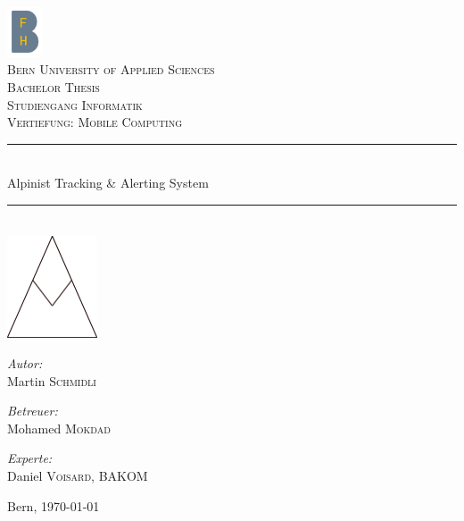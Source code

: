 \documentclass[11pt,english,german]{report}
\theoremstyle{definition}
\begin{document}
\pagestyle{empty} %
\begin{titlepage}
\begin{center}

\includegraphics[width=0.08\textwidth]{img/logo/bfh_logo.png}\\[1cm]    
\textsc{\LARGE Bern University of Applied Sciences}\\[1.5cm]
\textsc{\Large Bachelor Thesis}\\[0.2cm]
\textsc{\Large Studiengang Informatik}\\[0.2cm]
\textsc{\Large Vertiefung: Mobile Computing}\\[0.5cm]

\newcommand{\HRule}{\rule{\linewidth}{0.3mm}}
\HRule \\[0.4cm]
{\huge Alpinist Tracking \& Alerting System}\\[0.3cm]
{\huge \bfseries  }
\HRule \\[2cm]

\includegraphics[width=0.2\textwidth]{img/logo/atas_logo.png}\\[2.5cm]    

\begin{minipage}{0.3\textwidth}
\begin{flushleft} \large
\emph{Autor:}\\
Martin \textsc{Schmidli}\\
\end{flushleft}
\end{minipage}
\hfill
\begin{minipage}{0.3\textwidth}
\begin{flushleft} \large
\emph{Betreuer:} \\
Mohamed \textsc{Mokdad}
\end{flushleft}
\end{minipage}
\hfill
\begin{minipage}{0.38\textwidth}
\begin{flushleft} \large
\emph{Experte:}\\
Daniel \textsc{Voisard}, BAKOM\\
\end{flushleft}
\end{minipage}

\vspace{20mm}

Bern, {\large \today}
\end{center}
\end{titlepage}
\pagestyle{fancy}
\end{document}
